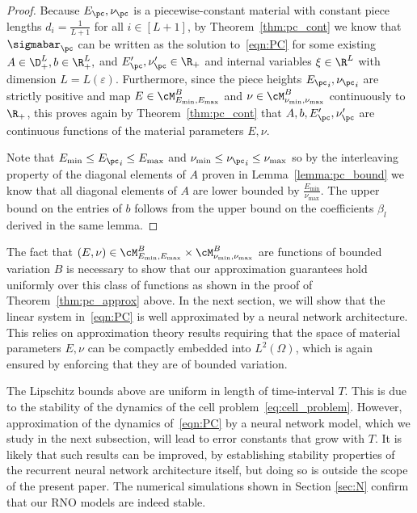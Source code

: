 \documentclass[letterpaper,11pt]{article}
\begin{document}
\begin{proof}
    Because $E_{\pc}, \nu_{\pc}$ is a piecewise-constant material with constant piece lengths $d_i = \frac{1}{L+1}$ for all $i \in [L+1]$, by Theorem~\ref{thm:pc_cont} we know that $\sigmabar_{\pc}$ can be written as the solution to~\eqref{eqn:PC} for some existing $A \in \D_+^L, b \in \R_+^L,$ and $E'_{\pc}, \nu'_{\pc} \in \R_+$ and internal variables $\xi \in \R^L$ with dimension $L = L(\varepsilon)$. Furthermore, since the piece heights ${E_{\pc}}_i, {\nu_{\pc}}_i$ are strictly positive and map $E \in \cM_{E_{\min}, E_{\max}}^B$ and $\nu \in \cM_{\nu_{\min}, \nu_{\max}}^B$ continuously to $\R_+$, this proves again by Theorem~\ref{thm:pc_cont} that $A, b, E'_{\pc}, \nu'_{\pc}$ are continuous functions of the material parameters $E, \nu$.

    Note that $E_{\min} \leq {E_{\pc}}_i \leq E_{\max}$ and $\nu_{\min} \leq {\nu_{\pc}}_i \leq \nu_{\max}$ so by the interleaving property of the diagonal elements of $A$ proven in Lemma~\ref{lemma:pc_bound} we know that all diagonal elements of $A$ are lower bounded by $\frac{E_{\min}}{\nu_{\max}}$. The upper bound on the entries of $b$ follows from the upper bound on the coefficients $\beta_l$ derived in the same lemma.
\end{proof}

The fact that $(E, \nu) \in \cM_{E_{\min}, E_{\max}}^B \times \cM_{\nu_{\min}, \nu_{\max}}^B$ are functions of bounded variation $B$ is necessary to show that our approximation guarantees hold uniformly over this class of functions as shown in the proof of Theorem~\ref{thm:pc_approx} above. In the next section, we will show that the linear system in~\eqref{eqn:PC} is well approximated by a neural network architecture. This relies on approximation theory results requiring that the space of material parameters $E, \nu$ can be compactly embedded into $L^2(\Omega)$, which is again ensured by enforcing that they are of bounded variation.

\begin{remark}
    The Lipschitz bounds above are uniform in length of time-interval $T$. This is due to the stability of the dynamics of the cell problem~\eqref{eq:cell_problem}.
    However, approximation of the dynamics of~\eqref{eqn:PC} by a neural network model,
    which we study in the next subsection, will lead to error constants that grow
    with $T$. It is likely that such results can be improved, by establishing stability properties of the recurrent neural network architecture itself, 
    but doing so is outside the scope of the present paper. The numerical simulations shown in Section \ref{sec:N} confirm that our RNO models are indeed stable.
\end{remark}
\end{document}

